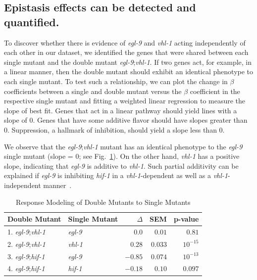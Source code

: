 \documentclass[9pt,twocolumn,twoside]{pnas-new}
\newcommand{\egl}{\emph{egl-9}}
\newcommand{\vhl}{\emph{vhl-1}}
\newcommand{\hif}{\emph{hif-1}}
\begin{document}
\subsection{Epistasis effects can be detected and quantified.}
\label{sub:Epistasis}
To discover whether there is evidence of \egl{} and \vhl{} acting independently of each other in our dataset, we identified the genes that were shared between each single mutant and the double mutant \egl{};\vhl{}. If two genes act, for example, in a linear manner, then the double mutant should exhibit an identical phenotype to each single mutant. To test such a relationship, we can plot the change in $\beta$ coefficients between a single and double mutant versus the $\beta$ coefficient in the respective single mutant and fitting a weighted linear regression to measure the slope of best fit. Genes that act in a linear pathway should yield lines with a slope of 0. Genes that have some additive flavor should have slopes greater than 0. Suppression, a hallmark of inhibition, should yield a slope less than 0.

We observe that the \egl{};\vhl{} mutant has an identical phenotype to the \egl{} single mutant (slope = 0; see Fig.~\ref{tab:double_mutant_comparison}). On the other hand, \vhl{} has a positive slope, indicating that \egl{} is additive to \vhl{}. Such partial additivity can be explained if \egl{} is inhibiting \hif{} in a \vhl{}-dependent as well as a \vhl{}-independent manner~\cite{Shao2009}.
\begin{table}%
\centering
\caption{Response Modeling of Double Mutants to Single Mutants}
\begin{tabular}{llrrr}
Double Mutant & Single Mutant & $\Delta$ & SEM & p-value\\
\midrule
1. \egl{};\vhl{} & \egl{} & $0.0$ & $0.01$ & $0.81$\\
2. \egl{};\vhl{} & \vhl{} & $0.28$ & $0.033$ & $10^{-15}$\\
3. \egl{};\hif{} & \egl{} & $-0.85$ & $0.074$ & $10^{-13}$\\
4. \egl{};\hif{} & \hif{} & $-0.18$ & $0.10$ & $0.097$\\
\bottomrule
\end{tabular}

\label{tab:double_mutant_comparison}
\end{table}
\end{document}
